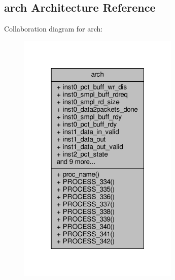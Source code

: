 \subsection{arch Architecture Reference}
\label{classdata2packets__top_1_1arch}


Collaboration diagram for arch\+:\nopagebreak
\begin{figure}[H]
\begin{center}
\leavevmode
\includegraphics[width=217pt]{d1/d93/classdata2packets__top_1_1arch__coll__graph}
\end{center}
\end{figure}
